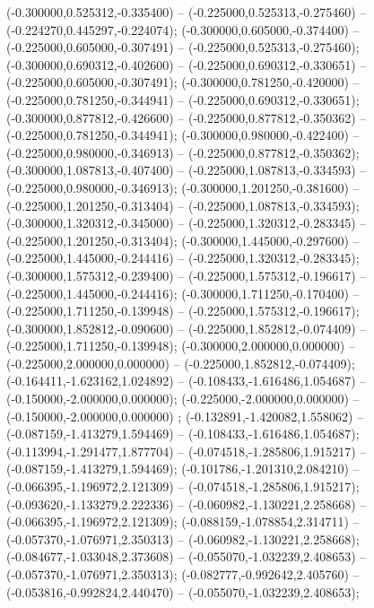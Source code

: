  (-0.300000,0.525312,-0.335400) -- (-0.225000,0.525313,-0.275460) -- (-0.224270,0.445297,-0.224074);
 (-0.300000,0.605000,-0.374400) -- (-0.225000,0.605000,-0.307491) -- (-0.225000,0.525313,-0.275460);
 (-0.300000,0.690312,-0.402600) -- (-0.225000,0.690312,-0.330651) -- (-0.225000,0.605000,-0.307491);
 (-0.300000,0.781250,-0.420000) -- (-0.225000,0.781250,-0.344941) -- (-0.225000,0.690312,-0.330651);
 (-0.300000,0.877812,-0.426600) -- (-0.225000,0.877812,-0.350362) -- (-0.225000,0.781250,-0.344941);
 (-0.300000,0.980000,-0.422400) -- (-0.225000,0.980000,-0.346913) -- (-0.225000,0.877812,-0.350362);
 (-0.300000,1.087813,-0.407400) -- (-0.225000,1.087813,-0.334593) -- (-0.225000,0.980000,-0.346913);
 (-0.300000,1.201250,-0.381600) -- (-0.225000,1.201250,-0.313404) -- (-0.225000,1.087813,-0.334593);
 (-0.300000,1.320312,-0.345000) -- (-0.225000,1.320312,-0.283345) -- (-0.225000,1.201250,-0.313404);
 (-0.300000,1.445000,-0.297600) -- (-0.225000,1.445000,-0.244416) -- (-0.225000,1.320312,-0.283345);
 (-0.300000,1.575312,-0.239400) -- (-0.225000,1.575312,-0.196617) -- (-0.225000,1.445000,-0.244416);
 (-0.300000,1.711250,-0.170400) -- (-0.225000,1.711250,-0.139948) -- (-0.225000,1.575312,-0.196617);
 (-0.300000,1.852812,-0.090600) -- (-0.225000,1.852812,-0.074409) -- (-0.225000,1.711250,-0.139948);
 (-0.300000,2.000000,0.000000) -- (-0.225000,2.000000,0.000000) -- (-0.225000,1.852812,-0.074409);
 (-0.164411,-1.623162,1.024892) -- (-0.108433,-1.616486,1.054687) -- (-0.150000,-2.000000,0.000000);
 (-0.225000,-2.000000,0.000000) -- (-0.150000,-2.000000,0.000000) ;
 (-0.132891,-1.420082,1.558062) -- (-0.087159,-1.413279,1.594469) -- (-0.108433,-1.616486,1.054687);
 (-0.113994,-1.291477,1.877704) -- (-0.074518,-1.285806,1.915217) -- (-0.087159,-1.413279,1.594469);
 (-0.101786,-1.201310,2.084210) -- (-0.066395,-1.196972,2.121309) -- (-0.074518,-1.285806,1.915217);
 (-0.093620,-1.133279,2.222336) -- (-0.060982,-1.130221,2.258668) -- (-0.066395,-1.196972,2.121309);
 (-0.088159,-1.078854,2.314711) -- (-0.057370,-1.076971,2.350313) -- (-0.060982,-1.130221,2.258668);
 (-0.084677,-1.033048,2.373608) -- (-0.055070,-1.032239,2.408653) -- (-0.057370,-1.076971,2.350313);
 (-0.082777,-0.992642,2.405760) -- (-0.053816,-0.992824,2.440470) -- (-0.055070,-1.032239,2.408653);
